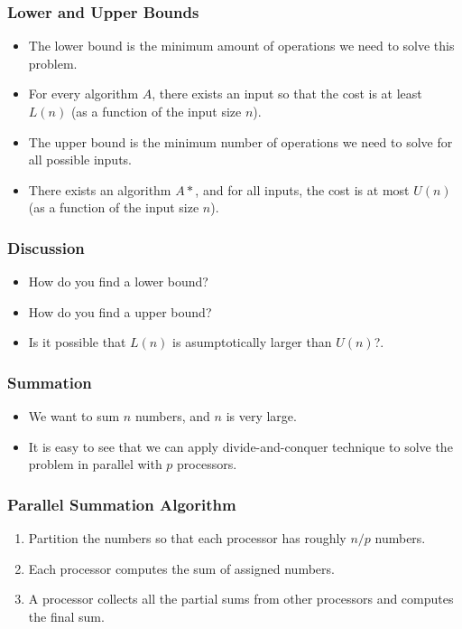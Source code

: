 \documentclass{beamer}
\begin{document}
\begin{CJK}{UTF8}{bsmi}
\begin{frame}
\frametitle{Lower and Upper Bounds}
\begin{itemize}
\item The lower bound is the minimum amount of operations we need to solve this problem.
\item For every algorithm $A$, there exists an input so that the cost is at least $L(n)$ (as a function of the input size $n$).
\item The upper bound is the minimum number of operations we need to solve for all possible inputs.
\item There exists an algorithm $A*$, and for all inputs, the cost is at most $U(n)$ (as a function of the input size $n$).
\end{itemize}
\end{frame}

\begin{frame}
\frametitle{Discussion}
\begin{itemize}
\item How do you find a lower bound?
\item How do you find a upper bound?
\item Is it possible that $L(n)$ is asumptotically larger than $U(n)$?. 
\end{itemize}
\end{frame}



\begin{frame}
\frametitle{Summation}
\begin{itemize}
\item We want to sum $n$ numbers, and $n$ is very large.
\item It is easy to see that we can apply divide-and-conquer technique  to solve the problem in parallel with $p$ processors.
\end{itemize}
\end{frame}

\begin{frame}
\frametitle{Parallel Summation Algorithm}
\begin{enumerate}
\item Partition the numbers so that each processor has roughly $n/p$ numbers.
\item Each processor computes the sum of assigned numbers.
\item A processor collects all the partial sums from other processors and computes the final sum.
\end{enumerate}
\end{frame}


\end{CJK}
\end{document}
